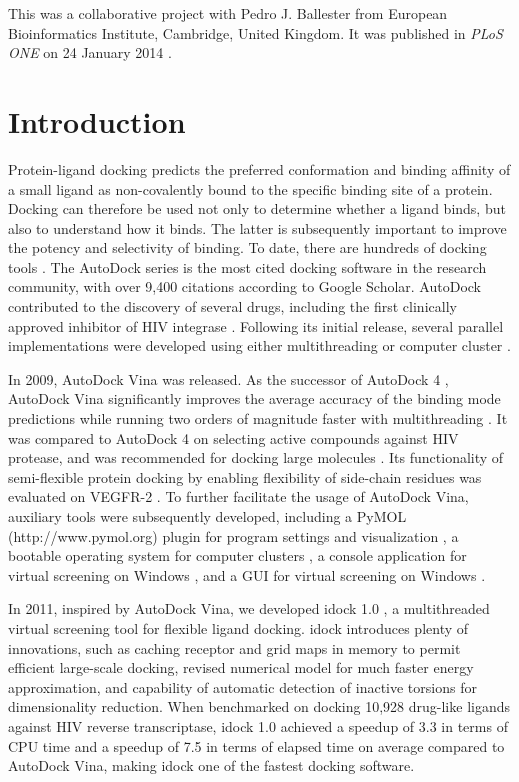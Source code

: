 This was a collaborative project with Pedro J. Ballester from European Bioinformatics Institute, Cambridge, United Kingdom. It was published in \textit{PLoS ONE} on 24 January 2014 \citep{1362}.


\section{Introduction}

Protein-ligand docking predicts the preferred conformation and binding affinity of a small ligand as non-covalently bound to the specific binding site of a protein. Docking can therefore be used not only to determine whether a ligand binds, but also to understand how it binds. The latter is subsequently important to improve the potency and selectivity of binding. To date, there are hundreds of docking tools \citep{493,922}. The AutoDock series \citep{597,596,595} is the most cited docking software in the research community, with over 9,400 citations according to Google Scholar. AutoDock contributed to the discovery of several drugs, including the first clinically approved inhibitor of HIV integrase \citep{1169}. Following its initial release, several parallel implementations were developed using either multithreading or computer cluster \citep{115,560,782}.

In 2009, AutoDock Vina \citep{595} was released. As the successor of AutoDock 4 \citep{596}, AutoDock Vina significantly improves the average accuracy of the binding mode predictions while running two orders of magnitude faster with multithreading \citep{595}. It was compared to AutoDock 4 on selecting active compounds against HIV protease, and was recommended for docking large molecules \citep{556}. Its functionality of semi-flexible protein docking by enabling flexibility of side-chain residues was evaluated on VEGFR-2 \citep{1084}. To further facilitate the usage of AutoDock Vina, auxiliary tools were subsequently developed, including a PyMOL (http://www.pymol.org) plugin for program settings and visualization \citep{609}, a bootable operating system for computer clusters \citep{773}, a console application for virtual screening on Windows \citep{1268}, and a GUI for virtual screening on Windows \citep{1250}.

In 2011, inspired by AutoDock Vina, we developed idock 1.0 \citep{1153}, a multithreaded virtual screening tool for flexible ligand docking. idock introduces plenty of innovations, such as caching receptor and grid maps in memory to permit efficient large-scale docking, revised numerical model for much faster energy approximation, and capability of automatic detection of inactive torsions for dimensionality reduction. When benchmarked on docking 10,928 drug-like ligands against HIV reverse transcriptase, idock 1.0 achieved a speedup of 3.3 in terms of CPU time and a speedup of 7.5 in terms of elapsed time on average compared to AutoDock Vina, making idock one of the fastest docking software.

